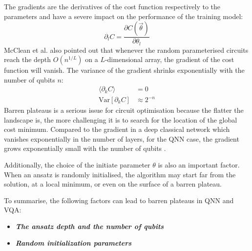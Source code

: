 The gradients are the derivatives of the cost function respectively to the parameters and have a severe impact on the performance of the training model:
\begin{equation}
    \partial_l C = \frac{\partial C(\vec{\theta})}{\partial\theta_l}
\end{equation}
McClean et al. \cite{mccleanBarrenPlateausQuantum2018} also pointed out that whenever the random parameterised circuits reach the depth $O(n^{1/L})$ on a $L$-dimensional array, the gradient of the cost function will vanish.
The variance of the gradient shrinks exponentially with the number of qubits $n$:
\begin{align}
    \langle \partial_k C\rangle & = 0  \label{Vanish Gradient}                  \\
    \mathrm{Var}[\partial_k C]  & \approx 2^{-n}  \label{Variance expo smaller}
\end{align}
Barren plateaus is a serious issue for circuit optimisation because the flatter the landscape is, the more challenging it is to search for the location of the global cost minimum.
Compared to the gradient in a deep classical network which vanishes exponentially in the number of layers, for the QNN case, the gradient grows exponentially small with the number of qubits \cite{mccleanBarrenPlateausQuantum2018}.

Additionally, the choice of the initiate parameter $\theta$ is also an important factor. When an ansatz is randomly initialised, the algorithm may start far from the solution, at a local minimum, or even on the surface of a barren plateau.

To summarise, the following factors can lead to barren plateaus in QNN and VQA:
\begin{itemize}
    \item \textbf{\emph{The ansatz depth and the number of qubits}}
    \item \textbf{\emph{Random initialization parameters}}
\end{itemize}

